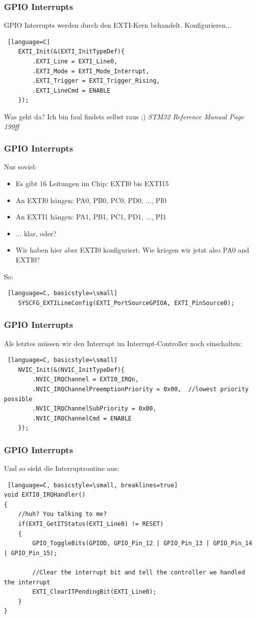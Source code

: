 \documentclass[ngerman,compress]{beamer}
\begin{document}
\begin{frame} [fragile]
	\frametitle{GPIO Interrupts}
	GPIO Interrupts werden durch den EXTI-Kern behandelt. Konfigurieren...
	\begin{lstlisting} [language=C]
	EXTI_Init(&(EXTI_InitTypeDef){
		.EXTI_Line = EXTI_Line0,
		.EXTI_Mode = EXTI_Mode_Interrupt,
		.EXTI_Trigger = EXTI_Trigger_Rising,
		.EXTI_LineCmd = ENABLE
	});
	\end{lstlisting}
	Was geht da? Ich bin faul findets selbst raus ;) \emph{STM32 Reference Manual Page 199ff}
\end{frame}

\begin{frame} [fragile]
	\frametitle{GPIO Interrupts}
	Nur soviel: 
	\begin{itemize}
		\item Es gibt 16 Leitungen im Chip: EXTI0 bis EXTI15
		\item An EXTI0 hängen: PA0, PB0, PC0, PD0, ..., PI0
		\item An EXTI1 hängen: PA1, PB1, PC1, PD1, ..., PI1
		\item ... klar, oder?
		\item Wir haben hier aber EXTI0 konfiguriert. Wie kriegen wir jetzt also PA0 and EXTI0?
	\end{itemize}
	\pause
	So:
	\begin{lstlisting} [language=C, basicstyle=\small]
	SYSCFG_EXTILineConfig(EXTI_PortSourceGPIOA, EXTI_PinSource0);
	\end{lstlisting}
\end{frame}

\begin{frame} [fragile]
	\frametitle{GPIO Interrupts}
	Als letztes müssen wir den Interrupt im Interrupt-Controller noch einschalten:
	\begin{lstlisting} [language=C, basicstyle=\small]
	NVIC_Init(&(NVIC_InitTypeDef){
		.NVIC_IRQChannel = EXTI0_IRQn,
		.NVIC_IRQChannelPreemptionPriority = 0x00,	//lowest priority possible
		.NVIC_IRQChannelSubPriority = 0x00,
		.NVIC_IRQChannelCmd = ENABLE
	});
	\end{lstlisting}
\end{frame}

\begin{frame} [fragile]
	\frametitle{GPIO Interrupts}
	Und so sieht die Interruptroutine aus:
	\begin{lstlisting} [language=C, basicstyle=\small, breaklines=true]
void EXTI0_IRQHandler()
{
    //huh? You talking to me?
    if(EXTI_GetITStatus(EXTI_Line0) != RESET)
    {
        GPIO_ToggleBits(GPIOD, GPIO_Pin_12 | GPIO_Pin_13 | GPIO_Pin_14 | GPIO_Pin_15);

        //Clear the interrupt bit and tell the controller we handled the interrupt
        EXTI_ClearITPendingBit(EXTI_Line0);
    }
}
	\end{lstlisting}
\end{frame}
\end{document}
